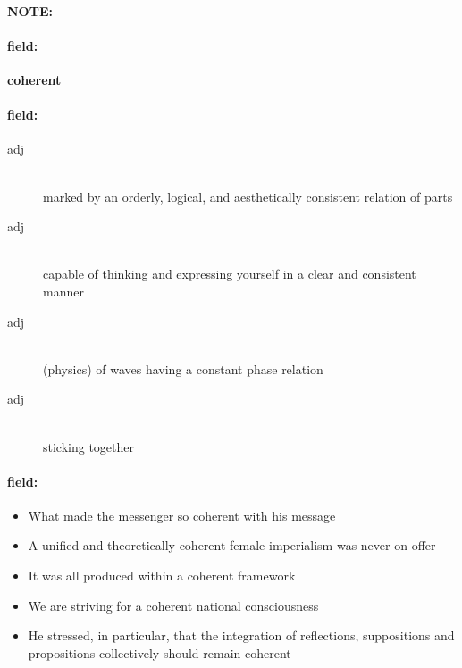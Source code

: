 \documentclass[12pt]{article}
\newenvironment{note}{\paragraph{NOTE:}}{}
\newenvironment{field}{\paragraph{field:}}{}
\begin{document}
\begin{note}
\begin{field}
\textbf{\large coherent}
\end{field}


\begin{field}
\begin{description}
\item[adj] \hfill \\ 
marked by an orderly, logical, and aesthetically consistent relation of parts

\item[adj] \hfill \\ 
capable of thinking and expressing yourself in a clear and consistent manner

\item[adj] \hfill \\ 
(physics) of waves having a constant phase relation

\item[adj] \hfill \\ 
sticking together

\end{description}
\end{field}

\begin{field}
\begin{itemize}
\item What made the messenger so coherent with his message
\item A unified and theoretically coherent female imperialism was never on offer
\item It was all produced within a coherent framework
\item We are striving for a coherent national consciousness
\item He stressed, in particular, that the integration of reflections, suppositions and propositions collectively should remain coherent
\end{itemize}
\end{field}
\end{note}
\end{document}
